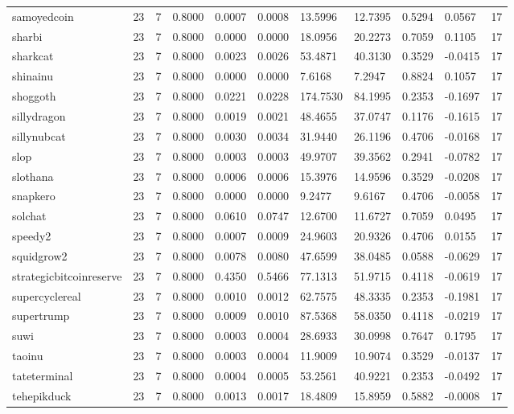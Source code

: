 \begin{table}[htbp]
\begin{tabular}{lllllllllll}
samoyedcoin & 23 & 7 & 0.8000 & 0.0007 & 0.0008 & 13.5996 & 12.7395 & 0.5294 & 0.0567 & 17 \\
sharbi & 23 & 7 & 0.8000 & 0.0000 & 0.0000 & 18.0956 & 20.2273 & 0.7059 & 0.1105 & 17 \\
sharkcat & 23 & 7 & 0.8000 & 0.0023 & 0.0026 & 53.4871 & 40.3130 & 0.3529 & -0.0415 & 17 \\
shinainu & 23 & 7 & 0.8000 & 0.0000 & 0.0000 & 7.6168 & 7.2947 & 0.8824 & 0.1057 & 17 \\
shoggoth & 23 & 7 & 0.8000 & 0.0221 & 0.0228 & 174.7530 & 84.1995 & 0.2353 & -0.1697 & 17 \\
sillydragon & 23 & 7 & 0.8000 & 0.0019 & 0.0021 & 48.4655 & 37.0747 & 0.1176 & -0.1615 & 17 \\
sillynubcat & 23 & 7 & 0.8000 & 0.0030 & 0.0034 & 31.9440 & 26.1196 & 0.4706 & -0.0168 & 17 \\
slop & 23 & 7 & 0.8000 & 0.0003 & 0.0003 & 49.9707 & 39.3562 & 0.2941 & -0.0782 & 17 \\
slothana & 23 & 7 & 0.8000 & 0.0006 & 0.0006 & 15.3976 & 14.9596 & 0.3529 & -0.0208 & 17 \\
snapkero & 23 & 7 & 0.8000 & 0.0000 & 0.0000 & 9.2477 & 9.6167 & 0.4706 & -0.0058 & 17 \\
solchat & 23 & 7 & 0.8000 & 0.0610 & 0.0747 & 12.6700 & 11.6727 & 0.7059 & 0.0495 & 17 \\
speedy2 & 23 & 7 & 0.8000 & 0.0007 & 0.0009 & 24.9603 & 20.9326 & 0.4706 & 0.0155 & 17 \\
squidgrow2 & 23 & 7 & 0.8000 & 0.0078 & 0.0080 & 47.6599 & 38.0485 & 0.0588 & -0.0629 & 17 \\
strategicbitcoinreserve & 23 & 7 & 0.8000 & 0.4350 & 0.5466 & 77.1313 & 51.9715 & 0.4118 & -0.0619 & 17 \\
supercyclereal & 23 & 7 & 0.8000 & 0.0010 & 0.0012 & 62.7575 & 48.3335 & 0.2353 & -0.1981 & 17 \\
supertrump & 23 & 7 & 0.8000 & 0.0009 & 0.0010 & 87.5368 & 58.0350 & 0.4118 & -0.0219 & 17 \\
suwi & 23 & 7 & 0.8000 & 0.0003 & 0.0004 & 28.6933 & 30.0998 & 0.7647 & 0.1795 & 17 \\
taoinu & 23 & 7 & 0.8000 & 0.0003 & 0.0004 & 11.9009 & 10.9074 & 0.3529 & -0.0137 & 17 \\
tateterminal & 23 & 7 & 0.8000 & 0.0004 & 0.0005 & 53.2561 & 40.9221 & 0.2353 & -0.0492 & 17 \\
tehepikduck & 23 & 7 & 0.8000 & 0.0013 & 0.0017 & 18.4809 & 15.8959 & 0.5882 & -0.0008 & 17 \\

\end{tabular}
\end{table}
